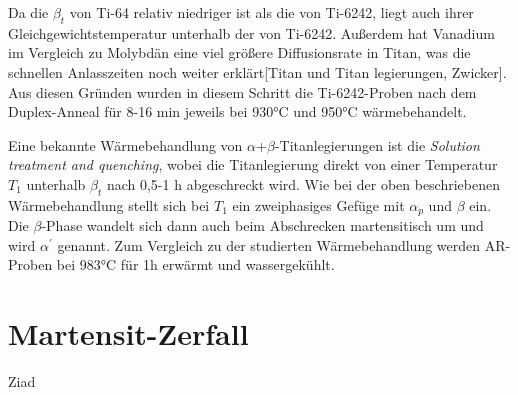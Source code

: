 Da die $\beta_{t}$ von Ti-64 relativ niedriger ist als die von Ti-6242, liegt auch ihrer Gleichgewichtstemperatur unterhalb der von Ti-6242. Außerdem hat Vanadium im Vergleich zu Molybdän eine viel größere Diffusionsrate in Titan, was die schnellen Anlasszeiten noch weiter erklärt[Titan und Titan legierungen, Zwicker]. Aus diesen Gründen wurden in diesem Schritt die Ti-6242-Proben nach dem Duplex-Anneal für 8-16 min jeweils bei 930°C und 950°C wärmebehandelt.

Eine bekannte Wärmebehandlung von $\alpha$+$\beta$-Titanlegierungen ist die  \textit{Solution treatment and quenching}, wobei die Titanlegierung direkt von einer Temperatur $T_{1}$ unterhalb  $\beta_{t}$ nach 0,5-1 h abgeschreckt wird. Wie bei der oben beschriebenen Wärmebehandlung stellt sich bei $T_{1}$ ein zweiphasiges Gefüge mit $\alpha_p$ und $\beta$ ein. Die $\beta$-Phase wandelt sich  dann auch beim Abschrecken martensitisch um und wird $\alpha^\prime$ genannt.
Zum Vergleich zu der studierten Wärmebehandlung werden AR-Proben bei 983°C für 1h erwärmt und wassergekühlt.

\section{Martensit-Zerfall}{Ziad}